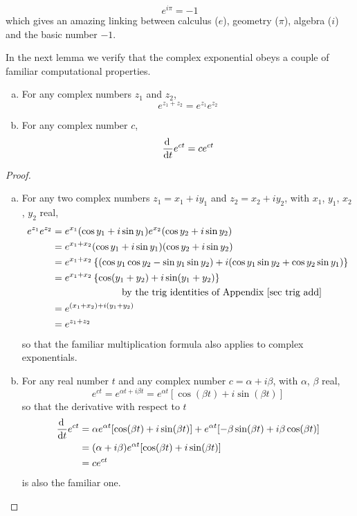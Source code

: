 \begin{equation*}
e^{i\pi}=-1
\end{equation*}
which gives an amazing linking between calculus ($e$), geometry ($\pi$),
algebra ($i$) and the basic number $-1$.

In the next lemma we verify that the complex exponential obeys a couple of familiar computational properties.
\begin{lemma}\label{lem_exp_ppties}
\begin{enumerate}[(a)]
\item 
For any complex numbers $z_1$ and $z_2$,
\begin{equation*}
e^{z_1+z_2} = e^{z_1}e^{z_2}
\end{equation*}
\item
For any complex number $c$,
\begin{equation*}
\diff{}{t}e^{ct} = c e^{ct}
\end{equation*}
\end{enumerate}
\end{lemma}
\begin{proof}
\begin{enumerate}[(a)]
\item
For any two complex numbers $z_1=x_1+iy_1$ and $z_2=x_2+iy_2$,
with $x_1$, $y_1$, $x_2$, $y_2$ real,
\begin{align*}
e^{z_1}e^{z_2}
&= e^{x_1}(\cos y_1+i \sin y_1)e^{x_2}(\cos y_2+i \sin y_2) \\
&= e^{x_1+x_2}(\cos y_1+i \sin y_1)(\cos y_2+i \sin y_2) \\
&= e^{x_1+x_2}\left\{(\cos y_1\cos y_2-\sin y_1\sin y_2)
              +i (\cos y_1\sin y_2+\cos y_2\sin y_1)\right\} \\
&= e^{x_1+x_2}\left\{\cos(y_1+y_2)+i\sin(y_1+y_2)\right\} \\
&\hskip1in\text{by the trig identities of Appendix~\ref{sec trig add}} \\
&= e^{(x_1+x_2)+i(y_1+y_2)} \\
&= e^{z_1+z_2}
\end{align*}
so that the familiar multiplication formula also applies to complex exponentials.

\item
For any real number $t$ and any complex number $c=\alpha+i\beta$, 
with $\alpha$, $\beta$ real,
\begin{equation*}
e^{ct}=e^{\alpha t+i\beta t}=e^{\alpha t}[\cos( \beta t)+i\sin(\beta t)]
\end{equation*}
so that the derivative with respect to $t$ 
\begin{align*}
\diff{}{t} e^{ct}
&=\alpha e^{\alpha t}[\cos( \beta t)+i\sin(\beta t)]
   +e^{\alpha t}[-\beta\sin( \beta t)+i\beta \cos(\beta t)] \\
&=(\alpha+i\beta) e^{\alpha t}[\cos( \beta t)+i\sin(\beta t)] \\
&=ce^{ct}
\end{align*}
is also the familiar one.
\end{enumerate}
\end{proof} 
